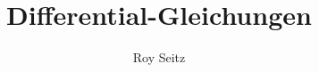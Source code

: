 %
%
%


\beamertemplatenavigationsymbolsempty
\title[DGL]{Differential-Gleichungen}
\author[R.~Seitz]{Roy Seitz}
\date[]{}

\newcommand{\gSL}[2]{\ensuremath{\text{SL}(#1, \mathbb{#2})}}
\newcommand{\gSO}[1]{\ensuremath{\text{SO}(#1)}}
\newcommand{\gGL}[2]{\ensuremath{\text{GL}(#1, \mathbb #2)}}

\newcommand{\asl}[2]{\ensuremath{\mathfrak{sl}(#1, \mathbb{#2})}}
\newcommand{\aso}[1]{\ensuremath{\mathfrak{so}(#1)}}
\newcommand{\agl}[2]{\ensuremath{\mathfrak{gl}(#1, \mathbb #2)}}

\DeclareMathOperator{\Spur}{Spur}


